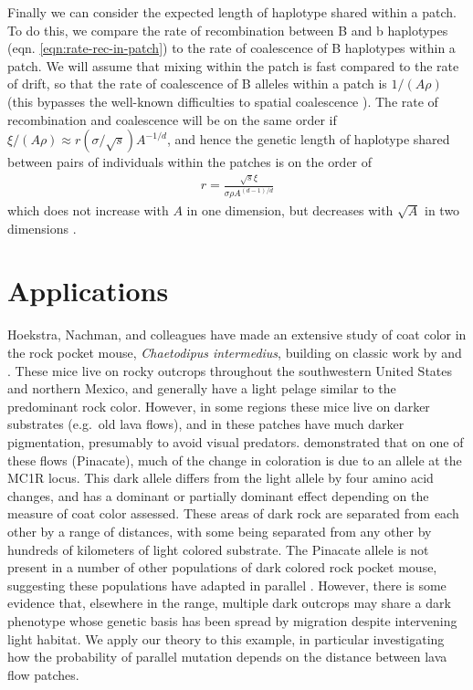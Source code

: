 \documentclass{article}
\begin{document}
Finally we can consider the expected length of haplotype shared within
a patch. To do this, we compare the rate of recombination between B
and b haplotypes (eqn. \ref{eqn:rate-rec-in-patch})
to the rate of coalescence of B haplotypes within a patch. We will
assume that mixing within the patch is fast compared to the rate of
drift, so that the rate of coalescence of B alleles within a patch is 
$1/(A\rho)$ 
(this bypasses the well-known difficulties to spatial coalescence \citep{felsenstein1978pain,bartonetheridgedepaulis}).
The rate of recombination and coalescence will be on the same order if
$\xi /(A\rho) \approx r (\sigma/\sqrt{s}) A^{-1/d}$, 
and hence the genetic length of haplotype shared between pairs of
individuals within the patches is on the order of
\begin{align}
  r = \frac{\sqrt{s} \xi}{\sigma \rho A^{(d-1)/d}} 
\end{align}
which does not increase with $A$ in one dimension,
but decreases with $\sqrt{A}$ in two dimensions .

\section{Applications} 
Hoekstra, Nachman, and colleagues have made an extensive study of coat color in the rock pocket mouse, 
\emph{Chaetodipus intermedius}, building on classic work by \citet{benson1933concealing} and \citet{dice1940ecologic}.
These mice live on rocky outcrops throughout the southwestern United States and northern Mexico, 
and generally have a light pelage similar to the predominant rock color.
However, in some regions these mice live on darker substrates (e.g.\ old lava flows),
and in these patches have much darker pigmentation, 
presumably to avoid visual predators.
\citet{nachman2003different} demonstrated that on one of these flows (Pinacate), 
much of the change in coloration is due to an allele at the MC1R locus.
This dark allele differs from the light allele by four amino acid changes, 
and has a dominant or partially dominant effect depending on the measure of coat color assessed. 
These areas of dark rock are separated from each other by a range of distances, 
with some being separated from any other by hundreds of kilometers of light colored substrate. 
The Pinacate allele is not present in a number of other populations of dark colored rock pocket mouse, 
suggesting these populations have adapted in parallel \citep{xxx}.
However, there is some evidence \citep{Hoekstra:05} that, elsewhere in the range, 
multiple dark outcrops may share a dark phenotype whose genetic basis has been spread by migration
despite intervening light habitat. 
We apply our theory to this example,
in particular investigating how the probability of parallel mutation depends on 
the distance between lava flow patches.
\end{document}
